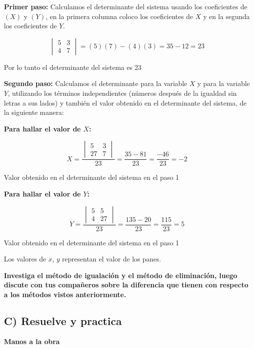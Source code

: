 \documentclass[12pt,a4paper]{article}
\begin{document}
\textbf{Primer paso:} Calculamos el determinante del sistema usando los coeficientes de $(X)$ y $(Y)$, en la primera columna coloco los coeficientes de $X$ y en la segunda los coeficientes de $Y$.

\[ \begin{vmatrix} 5 & 3 \\ 4 & 7 \end{vmatrix} = (5)(7) - (4)(3) = 35 - 12 = 23 \]

Por lo tanto el determinante del sistema es 23

\textbf{Segundo paso:} Calculamos el determinante para la variable $X$ y para la variable $Y$, utilizando los términos independientes (números después de la igualdad sin letras a sus lados) y también el valor obtenido en el determinante del sistema, de la siguiente manera:

\textbf{Para hallar el valor de $X$:}

\[ X = \frac{\begin{vmatrix} 5 & 3 \\ 27 & 7 \end{vmatrix}}{23} = \frac{35 - 81}{23} = \frac{-46}{23} = -2 \]

Valor obtenido en el determinante del sistema en el paso 1

\textbf{Para hallar el valor de $Y$:}

\[ Y = \frac{\begin{vmatrix} 5 & 5 \\ 4 & 27 \end{vmatrix}}{23} = \frac{135 - 20}{23} = \frac{115}{23} = 5 \]

Valor obtenido en el determinante del sistema en el paso 1

Los valores de $x$, $y$ representan el valor de los panes.

\vspace{1cm}

\textbf{Investiga el método de igualación y el método de eliminación, luego discute con tus compañeros sobre la diferencia que tienen con respecto a los métodos vistos anteriormente.}

\vspace{1.5cm}

\subsection*{C) Resuelve y practica}

\textbf{Manos a la obra}
\end{document}
